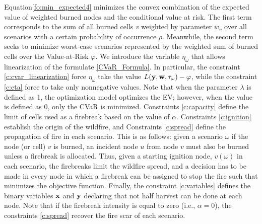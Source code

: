 \documentclass[a4paper,fleqn]{cas-sc}
\begin{document}
Equation\:\eqref{fo:min_expected4} minimizes the convex combination of the expected value of weighted burned nodes and the conditional value at risk. The first term corresponds to the sum of all burned cells \textit{v} weighted by parameter $w_v$ over all scenarios with a certain probability of occurrence $\rho$. Meanwhile, the second term seeks to minimize worst-case scenarios represented by the weighted sum of burned cells over the Value-at-Risk $\varphi$. We introduce the variable $\eta_\omega$ that allows linearization of the formulate \eqref{CVaR_Formula}. In particular, the constraint \eqref{c:cvar_linearization} force $\eta_{\omega}$ take the value  $L(\vb{y}, \vb{w}, \tau_\omega) - \varphi$, while the constraint \eqref{c:eta} force to take only nonnegative values. Note that when the parameter $\lambda$ is defined as 1, the optimization model optimizes the EV; however, when the value is defined as 0, only the CVaR is minimized. Constraints \eqref{c:capacity} define the limit of cells used as a firebreak based on the value of $\alpha$. Constraints \eqref{c:ignition} establish the origin of the wildfire, and Constraints \eqref{c:spread} define the propagation of fire in each scenario. This is as follows: given a scenario $\omega$ if the node (or cell) $v$ is burned, an incident node $u$ from node $v$ must also be burned unless a firebreak is allocated. Thus, given a starting ignition node, $v(\omega)$ in each scenario, the firebreaks limit the wildfire spread, and a decision has to be made in every node in which a firebreak can be assigned to stop the fire such that minimizes the objective function. Finally, the constraint \eqref{c:variables} defines the binary variables $\bf{x}$ and $\bf{y}$ declaring that not half harvest can be done at each node. Note that if the firebreak intensity is equal to zero (i.e., $\alpha=0$), the constraints \eqref{c:spread} recover the fire scar of each scenario.
\end{document}
